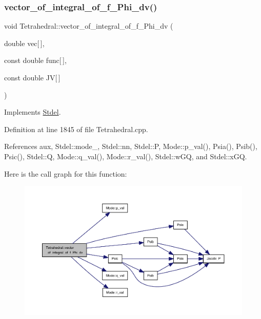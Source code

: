 \subsubsection{\texorpdfstring{vector\+\_\+of\+\_\+integral\+\_\+of\+\_\+f\+\_\+\+Phi\+\_\+dv()}{vector\_of\_integral\_of\_f\_Phi\_dv()}\hspace{0.1cm}{\footnotesize\ttfamily [1/2]}}
{\footnotesize\ttfamily void Tetrahedral\+::vector\+\_\+of\+\_\+integral\+\_\+of\+\_\+f\+\_\+\+Phi\+\_\+dv (\begin{DoxyParamCaption}\item[{double}]{vec\mbox{[}$\,$\mbox{]},  }\item[{const double}]{func\mbox{[}$\,$\mbox{]},  }\item[{const double}]{JV\mbox{[}$\,$\mbox{]} }\end{DoxyParamCaption})\hspace{0.3cm}{\ttfamily [virtual]}}



Implements \hyperlink{classStdel_aa5ef347c02106753c2d3961b59a7309e}{Stdel}.



Definition at line 1845 of file Tetrahedral.\+cpp.



References aux, Stdel\+::mode\+\_\+, Stdel\+::nn, Stdel\+::P, Mode\+::p\+\_\+val(), Psia(), Psib(), Psic(), Stdel\+::Q, Mode\+::q\+\_\+val(), Mode\+::r\+\_\+val(), Stdel\+::w\+GQ, and Stdel\+::x\+GQ.

Here is the call graph for this function\+:
\nopagebreak
\begin{figure}[H]
\begin{center}
\leavevmode
\includegraphics[width=350pt]{classTetrahedral_aff4e988560d3b0206b95d13d6b7e795b_cgraph}
\end{center}
\end{figure}
\mbox{\label{classTetrahedral_af8d3f23744224a67aaaebe66f427678f}} 

